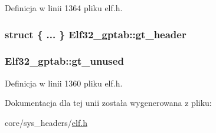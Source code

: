 Definicja w linii 1364 pliku elf.\-h.

\hypertarget{union_elf32__gptab_a441c6711b23ee48ff59b9e42287d146b}{
\subsubsection[{gt\-\_\-header}]{\setlength{\rightskip}{0pt plus 5cm}struct \{ ... \}   Elf32\-\_\-gptab\-::gt\-\_\-header}}\label{union_elf32__gptab_a441c6711b23ee48ff59b9e42287d146b}
\hypertarget{union_elf32__gptab_aefa9e4dcc4bff4e59999b01f0bc790bf}{
\subsubsection[{gt\-\_\-unused}]{ Elf32\-\_\-gptab\-::gt\-\_\-unused}}\label{union_elf32__gptab_aefa9e4dcc4bff4e59999b01f0bc790bf}


Definicja w linii 1360 pliku elf.\-h.



Dokumentacja dla tej unii została wygenerowana z pliku\-:\begin{DoxyCompactItemize}
\item 
core/sys\-\_\-headers/\hyperlink{elf_8h}{elf.\-h}\end{DoxyCompactItemize}
